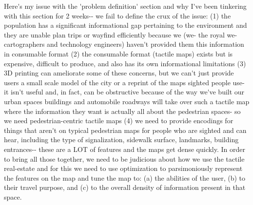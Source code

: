 \ac{Here's my issue with the 'problem definition' section and why I've been tinkering with this section for 2 weeks-- we fail to define the crux of the issue: (1) the population has a significant informational gap pertaining to the environment and they are unable plan trips or wayfind efficiently because we (we- the royal we- cartographers and technology engineers) haven't provided them this information in consumable format (2) the consumable format (tactile maps) exists but is expensive, difficult to produce, and also has its own informational limitations (3) 3D printing can ameliorate some of these concerns, but we can't just provide users a small scale model of the city or a reprint of the maps sighted people use- it isn't useful and, in fact, can be obstructive because of the way we've built our urban spaces buildings and automobile roadways will take over such a tactile map where the information they want is actually all about the pedestrian spaces- so we need pedestrian-centric tactile maps (4) we need to provide encodings for things that aren't on typical pedestrian maps for people who are sighted and can hear, including the type of signalization, sidewalk surface, landmarks, building entrances-- these are a LOT of features and the maps get dense quickly. In order to bring all those together, we need to be judicious about how we use the tactile real-estate and for this we need to use optimization to parsimoniously represent the features on the map and tune the map to: (a) the abilities of the user, (b) to their travel purpose, and (c) to the overall density of information present in that space.}



